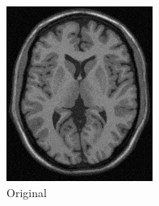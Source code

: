 \documentclass[11pt,twocolumn,twoside]{opticajnl}
\begin{document}
\begin{figure}[h]
    \centering
         \begin{subfigure}[h]{0.24\linewidth}
            \centering
            \includegraphics[width=\textwidth]{Figuras/ImagenA.png}
            \caption{Original} 
         \end{subfigure}
         \begin{subfigure}[h]{0.24\linewidth}
            \centering

\end{subfigure}
\end{figure}
\end{document}
